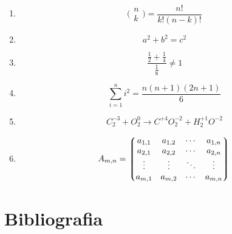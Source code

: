 \documentclass{article}
\begin{document}
\begin{enumerate}[\hspace{0,5cm}a)]
	
	\item 
	\begin{equation*}
	\Big(
		\begin{matrix}
		n \\ k
		\end{matrix}
	\Big) = \frac{n!}{k!(n-k)!}
	\end{equation*}
	
	\item 
	\begin{equation*}
	a^2 + b^2 = c^2
	\end{equation*}
	
	\item 
	\begin{equation*}
	\frac{ \frac{1}{2} + \frac{1}{4}} {\frac{1}{8}} \neq 1
	\end{equation*}
	
	\item 
	\begin{equation*}
	\sum_{i=1}^{n} i^2 = \frac{ n(n+1)(2n+1 )} {6}
	\end{equation*}
	
	\item 
	\begin{equation*}
	C_{2}^{-3} + O_{2}^{0} \rightarrow C^{+4}O_{2}^{-2} + H_{2}^{+1}O^{-2}
	\end{equation*}

	\item 
	\begin{equation*}
	A_{m,n} = 
	\left\lgroup
		\begin{matrix}
			a_{1,1} & a_{1,2} & \cdots & a_{1,n}  \\ 
			a_{2,1} & a_{2,2} & \cdots & a_{2,n}  \\ 
			\vdots & \vdots & \ddots & \vdots     \\ 
			a_{m,1} & a_{m,2} & \cdots & a_{m,n}  \\  
		\end{matrix}
	\right\rgroup
	\end{equation*}

\end{enumerate}


\vspace{1cm}
\section{Bibliografia}

 
\end{document}
